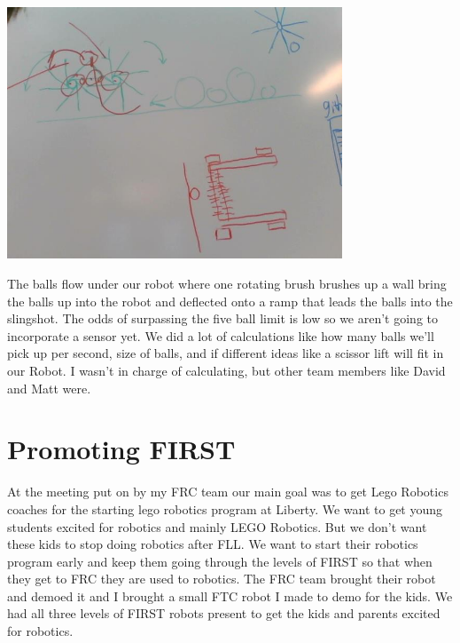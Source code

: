 \begin{center}
 \includegraphics[width=10cm]{./Entries/Images/RotatingBrushes.jpg}
 \end{center}

The balls flow under our robot where one rotating brush brushes up a wall bring the
balls up into the robot and deflected onto a ramp that leads the balls into the
slingshot. The odds of surpassing the five ball limit is low so we aren’t going to incorporate a sensor yet. 
We did a lot of calculations like how many balls we’ll pick up per second, size of balls, and if different ideas like a scissor lift will fit in our Robot. I wasn’t in charge of calculating, but other team members like David and Matt were.

\section*{Promoting FIRST}
At the meeting put on by my FRC team our main goal was to get Lego Robotics coaches for the starting lego robotics program at Liberty. We want to get young students excited for robotics and mainly LEGO Robotics. But we don’t want these kids to stop doing robotics after FLL. We want to start their robotics program early and keep them going through the levels of FIRST so that when they get to FRC they are used to robotics. The FRC team brought their robot and demoed it and I brought a small FTC robot I made to demo for the kids. We had all three levels of FIRST robots present to get the kids and parents excited for robotics.

